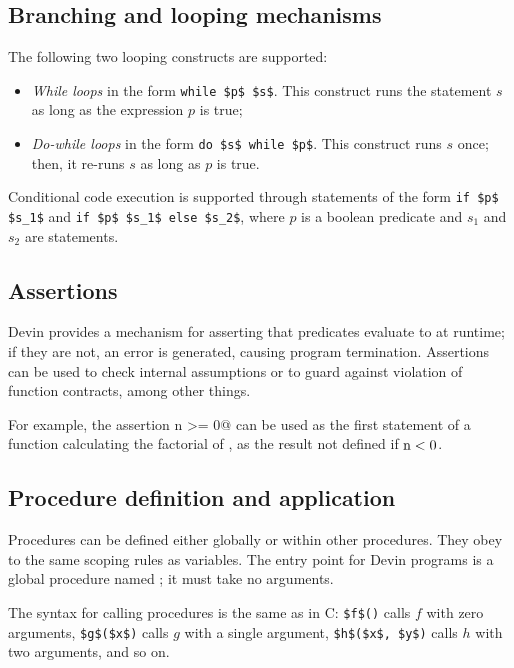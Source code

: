\documentclass[UdineBachThesis,american,11pt,draft]{PhdThesis}
\begin{document}
  \subsection{Branching and looping mechanisms}

  The following two looping constructs are supported:

  \begin{itemize}
    \item \emph{While loops} in the form \lstinline[mathescape]@while $p$ $s$@.
    This construct runs the statement $s$ as long as the expression $p$ is true;

    \item \emph{Do-while loops} in the form
    \lstinline[mathescape]@do $s$ while $p$@. This construct runs $s$ once;
    then, it re-runs $s$ as long as $p$ is true.
  \end{itemize}

  Conditional code execution is supported through statements of the form
  \lstinline[mathescape]@if $p$ $s_1$@ and
  \lstinline[mathescape]@if $p$ $s_1$ else $s_2$@, where $p$ is a boolean
  predicate and $s_1$ and $s_2$ are statements.

  \subsection{Assertions}

  Devin provides a mechanism for asserting that predicates evaluate to
  \lstinline@true@ at runtime; if they are not, an error is generated, causing
  program termination. Assertions can be used to check internal assumptions or
  to guard against violation of function contracts, among other things.

  For example, the assertion \lstinline@assert n >= 0@ can be used as the first
  statement of a function calculating the factorial of \lstinline@n@, as the
  result not defined if $\text{\lstinline@n@} < 0$.

  \subsection{Procedure definition and application}

  Procedures can be defined either globally or within other procedures. They
  obey to the same scoping rules as variables. The entry point for Devin
  programs is a global procedure named \lstinline@main@; it must take no
  arguments.

  The syntax for calling procedures is the same as in C:
  \lstinline[mathescape]@$f$()@ calls $f$ with zero arguments,
  \lstinline[mathescape]@$g$($x$)@ calls $g$ with a single argument,
  \lstinline[mathescape]@$h$($x$, $y$)@ calls $h$ with two arguments, and so on.
\end{document}
